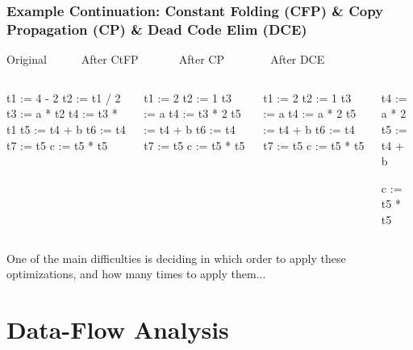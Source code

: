 \documentclass{beamer}
\newcommand{\emp}[1]{\textcolor{DikuRed}{ #1}}
\begin{document}
\begin{frame}[fragile,t]
    \frametitle{Example Continuation: Constant Folding (CFP) \&
                    Copy Propagation (CP) \& Dead Code Elim (DCE)}

\bigskip

\begin{block}{Original{\tt~~~~~~}After CtFP{\tt~~~~~~~}After CP{\tt~~~~~~~~}After DCE}
\begin{columns}
\begin{colorcode}[fontsize=\scriptsize]
\emp{t1 := 4  - 2}
\emp{t2 := t1 / 2}
t3 := a  * \emp{t2}
t4 := t3 * \emp{t1}
t5 := t4 + b
t6 := t4
t7 := t5
c  := t5 * t5
\end{colorcode} 
\begin{colorcode}[fontsize=\scriptsize]
t1 := 2
t2 := 1
\emp{t3 := a}
t4 := \emp{t3} * 2
t5 := t4 + b
t6 := t4
t7 := t5
c  := t5 * t5
\end{colorcode} 
\begin{colorcode}[fontsize=\scriptsize]
\emp{t1 := 2}
\emp{t2 := 1}
\emp{t3 := a}
t4 := a  * 2
t5 := t4 + b
\emp{t6 := t4}
\emp{t7 := t5}
c  := t5 * t5
\end{colorcode} 
\begin{colorcode}[fontsize=\scriptsize]



t4 := a  * 2
t5 := t4 + b


c  := t5 * t5
\end{colorcode} 
\end{columns}
\end{block}

\bigskip

One of the main difficulties is deciding in which order to apply 
these optimizations, and how many times to apply them...

\end{frame}


\section{Data-Flow Analysis}

\begin{frame}[fragile]
	\tableofcontents[currentsection]
\end{frame}
\end{document}
